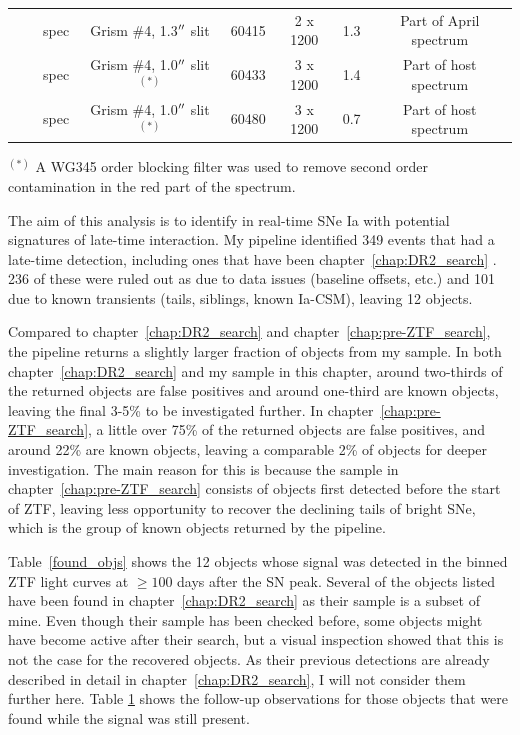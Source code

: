 \documentclass[a4paper,oneside,12pt, class=Latex/Classes/PhDthesisPSnPDF, crop=false]{standalone}
\begin{document}
\begin{table}
{\begin{tabular}{cccccccc}
        & & spec & Grism \#4, 1.3$^{\prime\prime}$ slit & 60415 & 2 x 1200 & 1.3 & Part of April spectrum\\
        & & spec & Grism \#4, 1.0$^{\prime\prime}$ slit $^{(*)}$ & 60433 & 3 x 1200 & 1.4 & Part of host spectrum\\
        & & spec & Grism \#4, 1.0$^{\prime\prime}$ slit $^{(*)}$ & 60480 & 3 x 1200 & 0.7 & Part of host spectrum\\
        \hline
    \end{tabular}
    }    
    \begin{flushleft}
        $^{(*)}$ A WG345 order blocking filter was used to remove second order contamination in the red part of the spectrum.
    \end{flushleft}
    \label{followups}
\end{table}

The aim of this analysis is to identify in real-time SNe Ia with potential signatures of late-time interaction. My pipeline identified 349 events that had a late-time detection, including ones that have been chapter~\ref{chap:DR2_search} \color{black}. 236 of these were ruled out as due to data issues (baseline offsets, etc.) and 101 due to known transients (tails, siblings, known Ia-CSM), leaving 12 objects.

Compared to chapter~\ref{chap:DR2_search} and chapter~\ref{chap:pre-ZTF_search}, the pipeline returns a slightly larger fraction of objects from my sample. In both chapter~\ref{chap:DR2_search} and my sample in this chapter, around two-thirds of the returned objects are false positives and around one-third are known objects, leaving the final 3-5\% to be investigated further. In chapter~\ref{chap:pre-ZTF_search}, a little over 75\% of the returned objects are false positives, and around 22\% are known objects, leaving a comparable 2\% of objects for deeper investigation. The main reason for this is because the sample in chapter~\ref{chap:pre-ZTF_search} consists of objects first detected before the start of ZTF, leaving less opportunity to recover the declining tails of bright SNe, which is the group of known objects returned by the pipeline.

Table~\ref{found_objs} shows the 12 objects whose signal was detected in the binned ZTF light curves at $\geq100$ days after the SN peak. Several of the objects listed have been found in chapter~\ref{chap:DR2_search} as their sample is a subset of mine. Even though their sample has been checked before, some objects might have become active after their search, but a visual inspection showed that this is not the case for the recovered objects. As their previous detections are already described in detail in chapter~\ref{chap:DR2_search}, I will not consider them further here. Table \ref{followups} shows the follow-up observations for those objects that were found while the signal was still present.
\end{document}
